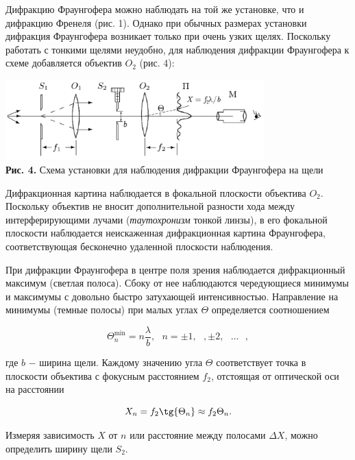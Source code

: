 \documentclass[a4paper,12pt]{article} %
\begin{document}
\hfill \break Дифракцию Фраунгофера можно наблюдать на той же установке, что и дифракцию Френеля (рис. 1). Однако при обычных размерах установки дифракция Фраунгофера возникает только при очень узких щелях. Поскольку работать с тонкими щелями неудобно, для наблюдения дифракции Фраунгофера к схеме добавляется объектив $O_2$ (рис. 4):

\begin{center}
\includegraphics[width=0.75\textwidth]{4.3.1_4.png}\\
\textbf{Рис. 4.} Схема установки для наблюдения дифракции Фраунгофера на щели \\
\end{center}

\hfill \break Дифракционная картина наблюдается в фокальной плоскости объектива $O_2$. Поскольку объектив не вносит дополнительной разности хода между интерферирующими лучами (\textit{таутохронизм} тонкой линзы), в его фокальной плоскости наблюдается неискаженная дифракционная картина Фраунгофера, соответствующая бесконечно удаленной плоскости наблюдения.

\hfill \break При дифракции Фраунгофера в центре поля зрения наблюдается дифракционный максимум (светлая полоса). Сбоку от нее наблюдаются чередующиеся минимумы и максимумы с довольно быстро затухающей интенсивностью. Направление на минимумы (темные полосы) при малых углах $\Theta$ определяется соотношением

\begin{equation}\label{ linkname }
\Theta_{n}^{\text{min}} = n\frac{\lambda}{b}, \text{ } n = \pm 1, \text{ }, \pm 2, \text{ } ... \text{ },
\end{equation}

\hfill \break где $b$ $-$ ширина щели. Каждому значению угла $\Theta$ соответствует точка в плоскости объектива с фокусным расстоянием $f_{2}$, отстоящая от оптической оси на расстоянии

\begin{equation}\label{ linkname }
X_{n} = f_2 \tg {\Theta_{n}} \approx f_2 \Theta_{n}.
\end{equation}

\hfill \break Измеряя зависимость $X$ от $n$ или расстояние между полосами $\Delta X$, можно определить ширину щели $S_2$.
\end{document}
